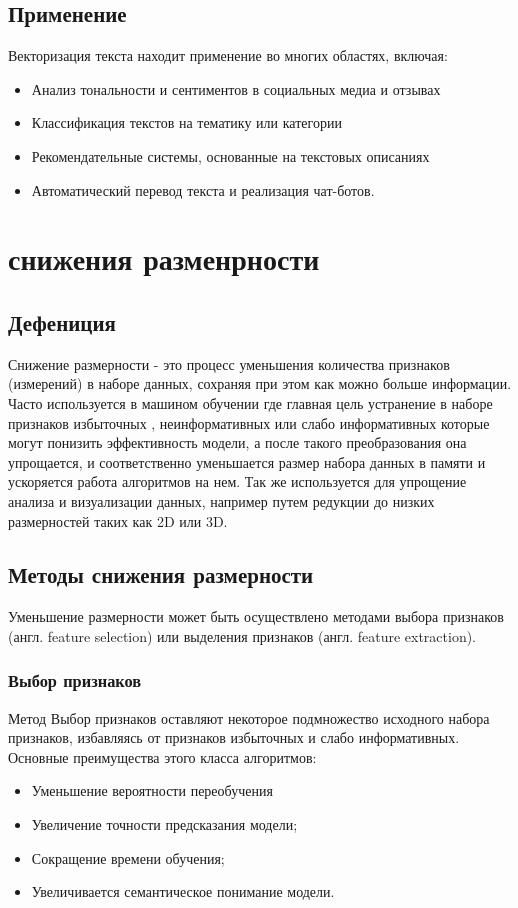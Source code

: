 	\subsection{Применение}
		Векторизация текста находит применение во многих областях, включая:
		\begin{itemize}
			\item Анализ тональности и сентиментов в социальных медиа и отзывах
			\item Классификация текстов на тематику или категории
			\item Рекомендательные системы, основанные на текстовых описаниях
			\item Автоматический перевод текста и реализация чат-ботов.
		\end{itemize}


\section{снижения разменрности}

	\subsection{Дефениция}
		Снижение размерности - это процесс уменьшения количества признаков (измерений) в наборе данных, сохраняя при этом как можно больше информации. Часто используется в машином обучении где главная цель устранение в наборе  признаков избыточных , неинформативных или слабо информативных которые могут  понизить эффективность модели, а после такого преобразования она упрощается, и соответственно уменьшается размер набора данных в памяти и ускоряется работа алгоритмов на нем. Так же используется для упрощение анализа и визуализации данных, например путем редукции до низких размерностей таких как 2D или 3D.

	\subsection{Методы снижения размерности}
		Уменьшение размерности может быть осуществлено методами выбора признаков (англ. feature selection) или выделения признаков (англ. feature extraction).
		
		\subsubsection{Выбор признаков}
			Метод Выбор признаков оставляют некоторое подмножество исходного набора признаков, избавляясь от признаков избыточных и слабо информативных. Основные преимущества этого класса алгоритмов:
			\begin{itemize}
				\item Уменьшение вероятности переобучения
				\item Увеличение точности предсказания модели;
				\item Сокращение времени обучения;
				\item Увеличивается семантическое понимание модели.\\
			\end{itemize}
		
